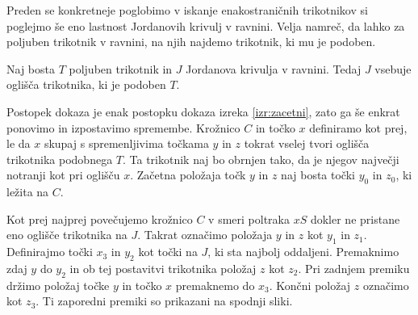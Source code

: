 \documentclass[mat1]{fmfdelo}
\begin{document}
Preden se konkretneje poglobimo v iskanje enakostraničnih trikotnikov si poglejmo še eno lastnost Jordanovih krivulj v ravnini. Velja namreč, da lahko za poljuben trikotnik v ravnini, na njih najdemo trikotnik, ki mu je podoben.
\begin{trditev}\label{trd:trik_poljuben}
Naj bosta $T$ poljuben trikotnik in $J$ Jordanova krivulja v ravnini. Tedaj $J$ vsebuje oglišča trikotnika, ki je podoben $T$.
\end{trditev}
\proof
Postopek dokaza je enak postopku dokaza izreka \ref{izr:zacetni}, zato ga še enkrat ponovimo in izpostavimo spremembe. Krožnico $C$ in točko $x$ definiramo kot prej, le da $x$ skupaj s spremenljivima točkama $y$ in $z$ tokrat vselej tvori oglišča trikotnika podobnega $T$. Ta trikotnik naj bo obrnjen tako, da je njegov največji notranji kot pri oglišču $x$. Začetna položaja točk $y$ in $z$ naj bosta točki $y_0$ in $z_0$, ki ležita na $C$. 


Kot prej najprej povečujemo krožnico $C$ v smeri poltraka $xS$ dokler ne pristane eno oglišče trikotnika na $J$. Takrat označimo položaja $y$ in $z$ kot $y_1$ in $z_1$. Definirajmo točki $x_3$ in $y_2$ kot točki na $J$, ki sta najbolj oddaljeni. Premaknimo zdaj $y$ do $y_2$ in ob tej postavitvi trikotnika položaj $z$ kot $z_2$. Pri zadnjem premiku držimo položaj točke $y$ in točko $x$ premaknemo do $x_3$. Končni položaj $z$ označimo kot $z_3$. Ti zaporedni premiki so prikazani na spodnji sliki.
\end{document}
